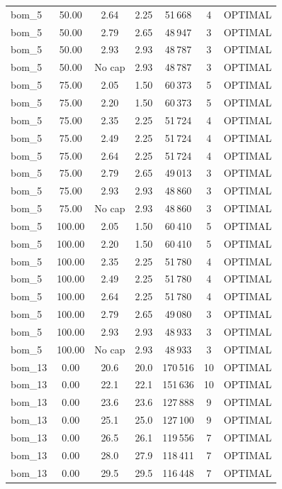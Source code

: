 \begin{longtable}{lcccccc}
bom\_5 & 50.00 & 2.64 & 2.25 & 51\,668 & 4 & OPTIMAL \\
bom\_5 & 50.00 & 2.79 & 2.65 & 48\,947 & 3 & OPTIMAL \\
bom\_5 & 50.00 & 2.93 & 2.93 & 48\,787 & 3 & OPTIMAL \\
bom\_5 & 50.00 & No cap & 2.93 & 48\,787 & 3 & OPTIMAL \\
bom\_5 & 75.00 & 2.05 & 1.50 & 60\,373 & 5 & OPTIMAL \\
bom\_5 & 75.00 & 2.20 & 1.50 & 60\,373 & 5 & OPTIMAL \\
bom\_5 & 75.00 & 2.35 & 2.25 & 51\,724 & 4 & OPTIMAL \\
bom\_5 & 75.00 & 2.49 & 2.25 & 51\,724 & 4 & OPTIMAL \\
bom\_5 & 75.00 & 2.64 & 2.25 & 51\,724 & 4 & OPTIMAL \\
bom\_5 & 75.00 & 2.79 & 2.65 & 49\,013 & 3 & OPTIMAL \\
bom\_5 & 75.00 & 2.93 & 2.93 & 48\,860 & 3 & OPTIMAL \\
bom\_5 & 75.00 & No cap & 2.93 & 48\,860 & 3 & OPTIMAL \\
bom\_5 & 100.00 & 2.05 & 1.50 & 60\,410 & 5 & OPTIMAL \\
bom\_5 & 100.00 & 2.20 & 1.50 & 60\,410 & 5 & OPTIMAL \\
bom\_5 & 100.00 & 2.35 & 2.25 & 51\,780 & 4 & OPTIMAL \\
bom\_5 & 100.00 & 2.49 & 2.25 & 51\,780 & 4 & OPTIMAL \\
bom\_5 & 100.00 & 2.64 & 2.25 & 51\,780 & 4 & OPTIMAL \\
bom\_5 & 100.00 & 2.79 & 2.65 & 49\,080 & 3 & OPTIMAL \\
bom\_5 & 100.00 & 2.93 & 2.93 & 48\,933 & 3 & OPTIMAL \\
bom\_5 & 100.00 & No cap & 2.93 & 48\,933 & 3 & OPTIMAL \\
bom\_13 & 0.00 & 20.6 & 20.0 & 170\,516 & 10 & OPTIMAL \\
bom\_13 & 0.00 & 22.1 & 22.1 & 151\,636 & 10 & OPTIMAL \\
bom\_13 & 0.00 & 23.6 & 23.6 & 127\,888 & 9 & OPTIMAL \\
bom\_13 & 0.00 & 25.1 & 25.0 & 127\,100 & 9 & OPTIMAL \\
bom\_13 & 0.00 & 26.5 & 26.1 & 119\,556 & 7 & OPTIMAL \\
bom\_13 & 0.00 & 28.0 & 27.9 & 118\,411 & 7 & OPTIMAL \\
bom\_13 & 0.00 & 29.5 & 29.5 & 116\,448 & 7 & OPTIMAL \\

\end{longtable}
